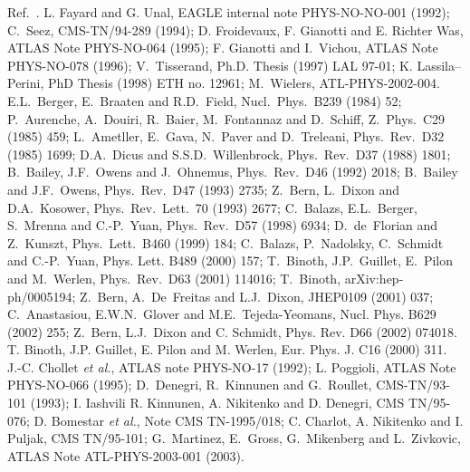 \begin{thebibliography}{999}
Ref.~\cite{Houches2003}. 
 L. Fayard and G. Unal, EAGLE internal note PHYS-NO-NO-001 
(1992); C.~Seez, CMS-TN/94-289 (1994);  D. Froidevaux, F. Gianotti 
and E. Richter Was, ATLAS Note PHYS-NO-064 (1995); F. Gianotti and I.~Vichou, 
ATLAS Note PHYS-NO-078 (1996); V.~Tisserand, 
Ph.D. Thesis (1997) LAL 97-01; K. Lassila--Perini, PhD Thesis (1998) ETH no. 
12961; M.~Wielers, ATL-PHYS-2002-004.    
%
E.L.~Berger, E.~Braaten and R.D.~Field, Nucl.\ Phys.\ B239 (1984)  52;
P.~Aurenche, A.~Douiri, R.~Baier, M.~Fontannaz and D.~Schiff, Z.\ Phys.\ C29
(1985) 459; L.~Ametller, E.~Gava, N.~Paver and D.~Treleani, Phys.\ Rev.\ D32
(1985) 1699; D.A.~Dicus and S.S.D.~Willenbrock, Phys.\ Rev.\ D37 (1988) 1801;
B.~Bailey, J.F.~Owens and J.~Ohnemus, Phys.\ Rev.\ D46 (1992) 2018;
B.~Bailey and J.F.~Owens, Phys.\ Rev.\ D47 (1993) 2735; 
Z.~Bern, L.~Dixon and D.A.~Kosower, Phys.\ Rev.\ Lett.\  70 (1993) 2677; 
C.~Balazs, E.L.~Berger, S.~Mrenna and C.-P.~Yuan, Phys.\ Rev.\ D57 (1998) 6934;
D.~de~Florian and Z.~Kunszt, Phys.\ Lett.\ B460 (1999) 184;
C.~Balazs, P.~Nadolsky, C.~Schmidt and C.-P.~Yuan, Phys. Lett. B489 (2000) 157;
T.~Binoth, J.P.~Guillet, E.~Pilon and M.~Werlen, Phys.\ Rev.\ D63 (2001) 
114016; T.~Binoth, arXiv:hep-ph/0005194; 
Z.~Bern, A.~De~Freitas and L.J.~Dixon, JHEP0109 (2001) 037;
C.~Anastasiou, E.W.N.~Glover and M.E.~Tejeda-Yeomans, Nucl. Phys. B629 (2002)
255; Z.~Bern, L.J.~Dixon and C. Schmidt, Phys. Rev. D66 (2002) 074018. 
% 
 T. Binoth, J.P. Guillet, E. Pilon and M. Werlen, Eur. Phys. 
J. C16 (2000) 311.
%
 J.-C. Chollet {\it et al.}, ATLAS note PHYS-NO-17 (1992); 
L. Poggioli, ATLAS Note PHYS-NO-066 (1995); D.~Denegri, R.~Kinnunen and 
G.~Roullet, CMS-TN/93-101 (1993); I. Iashvili R. Kinnunen, A. Nikitenko 
and D. Denegri, CMS TN/95-076; D. Bomestar {\it et al.}, Note CMS TN-1995/018; 
C. Charlot, A. Nikitenko and I. Puljak, CMS TN/95-101;  
G.~Martinez, E.~Gross, G.~Mikenberg and L.~Zivkovic,
ATLAS Note ATL-PHYS-2003-001 (2003).


\end{thebibliography}
